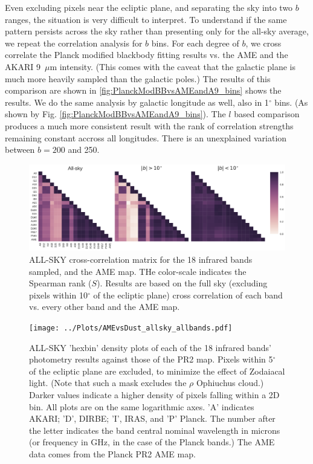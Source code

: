 \documentclass[preprint2,longabstract]{aastex}
\begin{document}
    Even excluding pixels near the ecliptic plane, and separating the sky into two $b$ ranges, the situation is very difficult to interpret. To understand if the same pattern persists across the sky rather than presenting only for the all-sky average, we repeat the correlation analysis for $b$ bins. For each degree of $b$, we cross correlate the Planck modified blackbody fitting results vs. the AME and the AKARI 9~$\mu$m intensity. (This comes with the caveat that the galactic plane is much more heavily sampled than the galactic poles.) The results of this comparison are shown in \ref{fig:PlanckModBBvsAMEandA9_bins} shows the results. We do the same analysis by galactic longitude as well, also in 1$^{\circ}$ bins. (As shown by Fig. \ref{fig:PlanckModBBvsAMEandA9_bins}). The $l$ based comparison produces a much more consistent result with the rank of correlation strengths remaining constant accross all longitudes. There is an unexplained variation between $b = 200$ and 250.


      \begin{figure}
        \label{fig:AME_IR_crosscorr_allbandsg}
        \includegraphics[width=185mm]{../Plots/all_bands_corr_matrix_wAME_spearman.pdf}
        \centering
        \caption{ALL-SKY cross-correlation matrix for the 18 infrared bands sampled, and the AME map. THe color-scale indicates the Spearman rank ($S$). Results are based on the full sky (excluding pixels within 10$^{\circ}$ of the ecliptic plane) cross correlation of each band vs. every other band and the AME map. }
      \end{figure}



      \begin{figure}
        \label{fig:AMEvsDust_allsky_allbands}
        \texttt{[image: ../Plots/AMEvsDust\_allsky\_allbands.pdf]}
        \centering
        \caption{ALL-SKY 'hexbin' density plots of each of the 18 infrared bands' photometry results against those of the PR2 map. Pixels within 5$^{\circ}$ of the ecliptic plane are excluded, to minimize the effect of Zodaiacal light. (Note that such a mask excludes the $\rho$ Ophiuchus cloud.) Darker values indicate a higher density of pixels falling within a 2D bin. All plots are on the same logarithmic axes. 'A' indicates AKARI; 'D', DIRBE; 'I', IRAS, and 'P' Planck. The number after the letter indicates the band central nominal wavelength in microns (or frequency in GHz, in the case of the Planck bands.) The AME data comes from the Planck PR2 AME map.}
      \end{figure}
\end{document}
